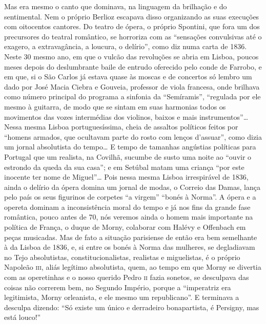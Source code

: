 Mas era mesmo o canto que dominava, na linguagem da brilhação e do
sentimental. Nem o próprio Berlioz escapava disso organizando as suas
execuções com oitocentos cantores. Do teatro de ópera, o próprio
Spontini, que fora um dos precursores do teatral romântico, se horroriza
com as ``sensações convulsivas até o exagero, a extravagância, a
loucura, o delírio'', como diz numa carta de 1836. Neste 30 mesmo ano,
em que o vulcão das revoluções se abria em Lisboa, poucos meses depois
do deslumbrante baile de entrudo oferecido pelo conde de Farrobo, e em
que, si o São Carlos já estava quase às moscas e de concertos só lembro
um dado por José Macia Ciebra e Gouveia, professor de viola francesa,
onde brilhava como número principal do programa a sinfonia da
``Semíramis'', ``regulada por ele mesmo à guitarra, de modo que se
sintam em suas harmonias todos os movimentos das vozes intermédias dos
violinos, baixos e mais instrumentos''\ldots{} Nessa mesma Lisboa
portuguesíssima, cheia de assaltos políticos feitos por ``homens
armados, que ocultavam parte do rosto com lenços d'assuar'', como dizia
um jornal absolutista do tempo\ldots{} E tempo de tamanhas angústias
políticas para Portugal que um realista, na Covilhã, sucumbe de susto
uma noite ao ``ouvir o estrondo da queda da sua casa''; e em Setúbal
matam uma criança ``por este inocente ter nome de Miguel''\ldots{} Pois nessa
mesma Lisboa irrespirável de 1836, ainda o delírio da ópera domina um
jornal de modas, o Correio das Damas, lança pelo país os seus figurinos
de corpetes ``a virgem'' ``bonés à Norma''. A ópera e a opereta dominam
a inconsistência moral do tempo e já nos fins da grande fase romântica,
pouco antes de 70, nós veremos ainda o homem mais importante na política
de França, o duque de Morny, colaborar com Halévy e Offenbach em peças
musicadas. Mas de fato a situação parisiense de então era bem semelhante
à da Lisboa de 1836, e, si entre os bonés à Norma das mulheres, se
degladiavam no Tejo absolutistas, constitucionalistas, realistas e
miguelistas, é o próprio Napoleão \textsc{iii}, aliás legítimo absolutista, quem,
ao tempo em que Morny se divertia com as operetinhas e o nosso querido
Pedro \textsc{ii} fazia sonetos, se desculpava das coisas não correrem bem, no
Segundo Império, porque a ``imperatriz era legitimista, Morny
orleanista, e ele mesmo um republicano''. E terminava a desculpa
dizendo: ``Só existe um único e derradeiro bonapartista, é Persigny, mas
está louco!''

